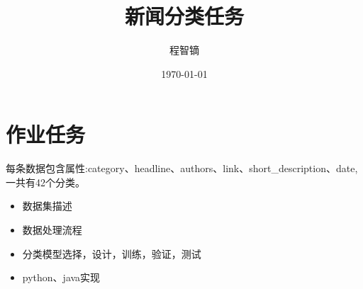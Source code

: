 \documentclass{article}
\title{新闻分类任务}
\author{程智镝}
\date{\today}
\begin{document}
\maketitle

\section*{作业任务}
每条数据包含属性:category、headline、authors、link、short\_description、date,一共有42个分类。
\begin{itemize}
    \item 数据集描述
    \item 数据处理流程
    \item 分类模型选择，设计，训练，验证，测试
    \item python、java实现
\end{itemize}
\end{document}
